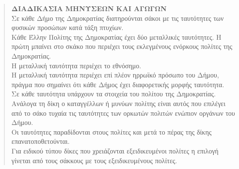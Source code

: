 \documentclass[a4paper]{article}
\begin{document}
\begin{itemize}
\begin{quotation}
\textbf{ΔΙΑΔΙΚΑΣΙΑ ΜΗΝΥΣΕΩΝ ΚΑΙ ΑΓΩΓΩΝ}\\
Σε κάθε Δήμο της Δημοκρατίας διατηρούνται σάκοι με τις ταυτότητες των φυσικών προσώπων κατά τάξη πτυχίων.\\
Κάθε Έλλην Πολίτης της Δημοκρατίας έχει δύο μεταλλικές ταυτότητες. Η πρώτη μπαίνει στο σκάκο που περιέχει τους εκλεγμένους ενόρκους πολίτες της Δημοκρατίας. \\
Η μεταλλική ταυτότητα περιέχει το εθνόσημο.\\
Η μεταλλική ταυτότητα περιέχει επί πλέον ηρρωϊκό πρόσωπο του Δήμου, πράγμα που σημαίνει ότι κάθε Δήμος έχει διαφορετικής μορφής ταυτότητα.\\
Σε κάθε ταυτότητα υπάρχουν τα στοιχεία του πολίτου της Δημοκρατίας.\\
Ανάλογα τη δίκη ο καταγγέλλων ή μυνύων πολίτης είναι αυτός που επιλέγει από το σάκο τυχαία τις ταυτότητες των ορκωτών πολιτών ενώπιον οργάνων του Δήμου.\\
Οι ταυτότητες παραδίδονται στους πολίτες και μετά το πέρας της δίκης επανατοποθετούνται.\\
Για ειδικού τύπου δίκες που χρειάζονται εξειδικευμένοι πολίτες η επιλογή γίνεται από τους σάκκους με τους εξειδικευμένους πολίτες.\\
\end{quotation}


\end{itemize}
\end{document}
